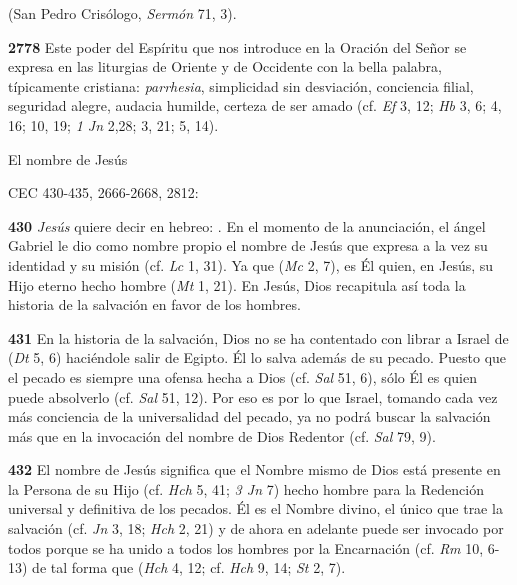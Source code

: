  (San Pedro Crisólogo, \emph{Sermón} 71, 3).

\textbf{2778} Este poder del Espíritu que nos introduce en la Oración del Señor se expresa en las liturgias de Oriente y de Occidente con la bella palabra, típicamente cristiana: \emph{parrhesia}, simplicidad sin desviación, conciencia filial, seguridad alegre, audacia humilde, certeza de ser amado (cf. \emph{Ef} 3, 12; \emph{Hb} 3, 6; 4, 16; 10, 19; \emph{1 Jn} 2,28; 3, 21; 5, 14).

El nombre de Jesús

CEC 430-435, 2666-2668, 2812:

\textbf{430} \emph{Jesús} quiere decir en hebreo: . En el momento de la anunciación, el ángel Gabriel le dio como nombre propio el nombre de Jesús que expresa a la vez su identidad y su misión (cf. \emph{Lc} 1, 31). Ya que  (\emph{Mc} 2, 7), es Él quien, en Jesús, su Hijo eterno hecho hombre  (\emph{Mt} 1, 21). En Jesús, Dios recapitula así toda la historia de la salvación en favor de los hombres.

\textbf{431} En la historia de la salvación, Dios no se ha contentado con librar a Israel de  (\emph{Dt} 5, 6) haciéndole salir de Egipto. Él lo salva además de su pecado. Puesto que el pecado es siempre una ofensa hecha a Dios (cf. \emph{Sal} 51, 6), sólo Él es quien puede absolverlo (cf. \emph{Sal} 51, 12). Por eso es por lo que Israel, tomando cada vez más conciencia de la universalidad del pecado, ya no podrá buscar la salvación más que en la invocación del nombre de Dios Redentor (cf. \emph{Sal} 79, 9).

\textbf{432} El nombre de Jesús significa que el Nombre mismo de Dios está presente en la Persona de su Hijo (cf. \emph{Hch} 5, 41; \emph{3 Jn} 7) hecho hombre para la Redención universal y definitiva de los pecados. Él es el Nombre divino, el único que trae la salvación (cf. \emph{Jn} 3, 18; \emph{Hch} 2, 21) y de ahora en adelante puede ser invocado por todos porque se ha unido a todos los hombres por la Encarnación (cf. \emph{Rm} 10, 6-13) de tal forma que  (\emph{Hch} 4, 12; cf. \emph{Hch} 9, 14; \emph{St} 2, 7).

